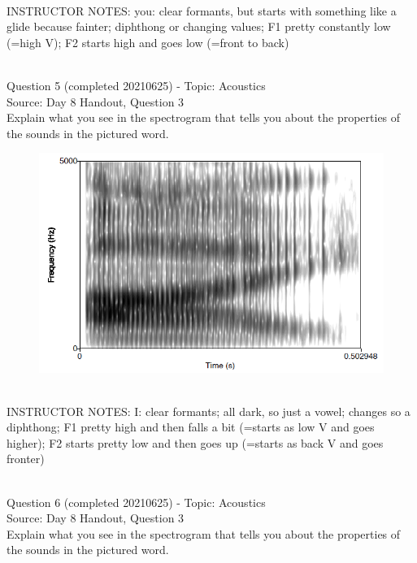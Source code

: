 \documentclass[12pt]{article}
\begin{document}
~\\
INSTRUCTOR NOTES: you: clear formants, but starts with something like a glide because fainter; diphthong or changing values; F1 pretty constantly low (=high V); F2 starts high and goes low (=front to back)


~\\

{\large Question 5} (completed 20210625) - Topic: Acoustics\\
Source: Day 8 Handout, Question 3\\

Explain what you see in the spectrogram that tells you about the properties of the sounds in the pictured word.\\

\begin{figure}[H]
\includegraphics{../images/spectrogram_I.png}
\end{figure}

~\\
INSTRUCTOR NOTES: I: clear formants; all dark, so just a vowel; changes so a diphthong; F1 pretty high and then falls a bit (=starts as low V and goes higher); F2 starts pretty low and then goes up (=starts as back V and goes fronter)


~\\

{\large Question 6} (completed 20210625) - Topic: Acoustics\\
Source: Day 8 Handout, Question 3\\

Explain what you see in the spectrogram that tells you about the properties of the sounds in the pictured word.\\
\end{document}

